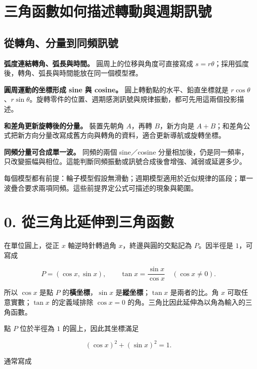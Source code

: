 \documentclass[11pt,a4paper]{article}
\begin{document}
\section{三角函數如何描述轉動與週期訊號}\label{ux4e09ux89d2ux51fdux6578ux5982ux4f55ux63cfux8ff0ux8f49ux52d5ux8207ux9031ux671fux8a0aux865f}

\subsection{從轉角、分量到同頻訊號}\label{ux5f9eux8f49ux89d2ux5206ux91cfux5230ux540cux983bux8a0aux865f}

\textbf{弧度連結轉角、弧長與時間。} 圓周上的位移與角度可直接寫成 \(s=r\theta\)；採用弧度後，轉角、弧長與時間能放在同一個模型裡。

\textbf{圓周運動的坐標形成 sine 與 cosine。} 圓上轉動點的水平、鉛直坐標就是 \(r\cos\theta\)、\(r\sin\theta\)。旋轉零件的位置、週期感測訊號與規律振動，都可先用這兩個投影描述。

\textbf{和差角更新旋轉後的分量。} 裝置先朝角 \(A\)，再轉 \(B\)，新方向是 \(A+B\)；和差角公式把新方向分量改寫成舊方向與轉角的資料，適合更新導航或旋轉坐標。

\textbf{同頻分量可合成單一波。} 同頻的兩個 sine／cosine 分量相加後，仍是同一頻率，只改變振幅與相位。這能判斷同頻振動或訊號合成後會增強、減弱或延遲多少。

每個模型都有前提：輪子模型假設無滑動；週期模型適用於近似規律的區段；單一波疊合要求兩項同頻。這些前提界定公式可描述的現象與範圍。

\section{0. 從三角比延伸到三角函數}\label{ux5f9eux4e09ux89d2ux6bd4ux5ef6ux4f38ux5230ux4e09ux89d2ux51fdux6578}

在單位圓上，從正 \(x\) 軸逆時針轉過角 \(x\)，終邊與圓的交點記為 \(P\)。因半徑是 \(1\)，可寫成

\[
P=(\cos x,\sin x),
\qquad
\tan x=\frac{\sin x}{\cos x}\quad(\cos x\ne0).
\]

所以 \(\cos x\) 是點 \(P\) 的\textbf{橫坐標}，\(\sin x\) 是\textbf{縱坐標}；\(\tan x\) 是兩者的比。角 \(x\) 可取任意實數；\(\tan x\) 的定義域排除 \(\cos x=0\) 的角。三角比因此延伸為以角為輸入的三角函數。

點 \(P\) 位於半徑為 \(1\) 的圓上，因此其坐標滿足

\[
(\cos x)^2+(\sin x)^2=1.
\]

通常寫成
\end{document}
